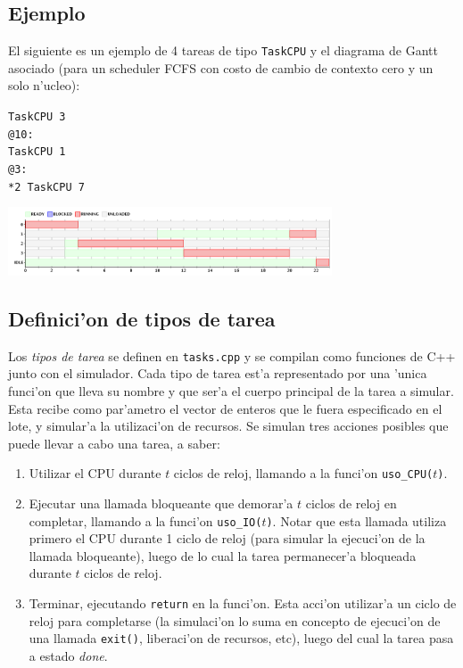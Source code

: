 \documentclass[a4paper,11pt]{article}
\begin{document}
\subsection*{Ejemplo}

\medskip
El siguiente es un ejemplo de 4 tareas de tipo \texttt{TaskCPU} y el diagrama de Gantt asociado (para un scheduler FCFS con costo de cambio de contexto cero y un solo n'ucleo):
\begin{multicols}{4}{
\begin{framed}\noindent\scriptsize\texttt{TaskCPU 3 \\
@10: \\
TaskCPU 1 \\
@3: \\
{*}2 TaskCPU 7}
\end{framed}
\includegraphics[keepaspectratio, width=0.72\textwidth]{ejemplo1.png}
}
\end{multicols}


\subsection*{Definici'on de tipos de tarea}

Los \emph{tipos de tarea} se definen en \texttt{tasks.cpp} y se compilan
como funciones de C++ junto con el simulador. Cada tipo de tarea est'a
representado por una 'unica funci'on que lleva su nombre y que ser'a el
cuerpo principal de la tarea a simular. Esta recibe como par'ametro
el vector de enteros que le fuera especificado en el lote, y simular'a
la utilizaci'on de recursos. Se simulan tres acciones posibles
que puede llevar a cabo una tarea, a saber:
\begin{enumerate}
        \item Utilizar el CPU durante $t$ ciclos de reloj, llamando a la funci'on \texttt{uso\_CPU($t$)}.
        \item Ejecutar una llamada bloqueante que demorar'a $t$ ciclos de
        reloj en completar, llamando a la funci'on \texttt{uso\_IO($t$)}.
        Notar que esta llamada utiliza primero el CPU durante 1 ciclo de reloj
        (para simular la ejecuci'on de la llamada bloqueante), luego de lo cual
        la tarea permanecer'a bloqueada durante $t$ ciclos de reloj.
        \item Terminar, ejecutando \texttt{return} en la funci'on. Esta acci'on
        utilizar'a un ciclo de reloj para completarse (la simulaci'on lo suma en
        concepto de ejecuci'on de una llamada \texttt{exit()}, liberaci'on de recursos, etc),
        luego del cual la tarea pasa a estado \emph{done}.
\end{enumerate}
\end{document}
